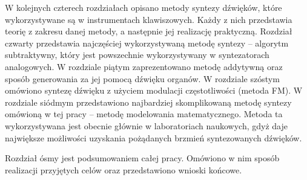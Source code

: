 W kolejnych czterech rozdziałach opisano metody syntezy dźwięków, które wykorzystywane są w instrumentach klawiszowych. Każdy z nich przedstawia teorię z zakresu danej metody, a następnie jej realizację praktyczną. Rozdział czwarty przedstawia najczęściej wykorzystywaną metodę syntezy – algorytm subtraktywny, który jest powszechnie wykorzystywany w syntezatorach analogowych. W rozdziale piątym zaprezentowano metodę addytywną oraz sposób generowania za jej pomocą dźwięku organów. W rozdziale szóstym omówiono syntezę dźwięku z użyciem modulacji częstotliwości (metoda FM). W rozdziale siódmym przedstawiono najbardziej skomplikowaną metodę syntezy omówioną w tej pracy – metodę modelowania matematycznego. Metoda ta wykorzystywana jest obecnie głównie w laboratoriach naukowych, gdyż daje największe możliwości uzyskania pożądanych brzmień syntezowanych dźwięków.

Rozdział ósmy jest podsumowaniem całej pracy. Omówiono w nim sposób realizacji przyjętych celów oraz przedstawiono wnioski końcowe.